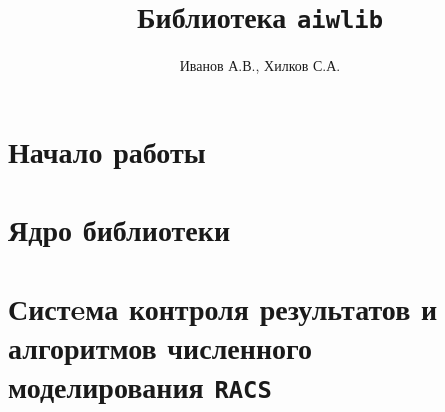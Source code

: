 \documentclass[12pt]{book}
\begin{document}
\title{Библиотека {\tt aiwlib}}
\author{
Иванов А.В., Хилков С.А. 
} %

\maketitle

\tableofcontents


\chapter{Начало работы} %
% 



\chapter{Ядро библиотеки}






















\chapter{Систeма контроля результатов и алгоритмов численного моделирования {\tt RACS}} 












\end{document}
